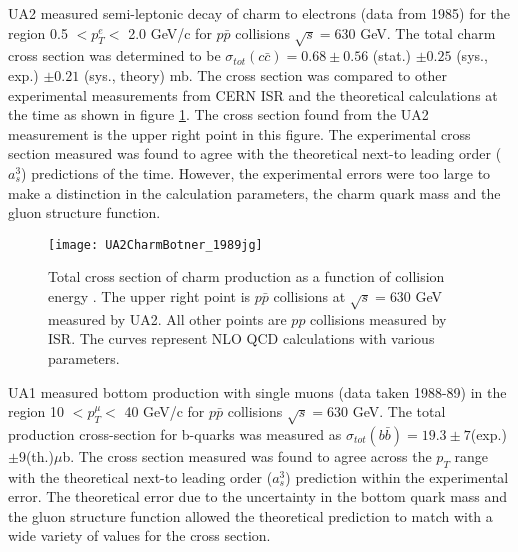UA2 measured semi-leptonic decay of charm to electrons \cite{Botner:1989jg} (data from 1985) for the region 0.5 $< p_{T}^{e} <$ 2.0 GeV/c for $p \bar p$ collisions $\sqrt{s} = $630 GeV. The total charm cross section was determined to be $\sigma _{tot}(c \bar c) = 0.68 \pm 0.56$ (stat.) $ \pm 0.25$ (sys., exp.) $ \pm 0.21 $ (sys., theory) mb. The cross section was compared to other experimental measurements from CERN ISR and the theoretical calculations at the time as shown in figure \ref{fig:UA2CharmBotner_1989jg}. The cross section found from the UA2 measurement is the upper right point in this figure.  The experimental cross section measured was found to agree with the theoretical next-to leading order ($a_{s}^{3}$) predictions of the time. However, the experimental errors were too large to make a distinction in the calculation parameters, the charm quark mass and the gluon structure function.

\begin{figure}[h]
  \centering
  \texttt{[image: UA2CharmBotner\_1989jg]}\\
  \caption{Total cross section of charm production as a function of collision energy \cite{Botner:1989jg}. The upper right point is $p \bar p$ collisions at $\sqrt{s} = $630 GeV measured by UA2. All other points are $pp$ collisions measured by ISR. The curves represent NLO QCD calculations with various parameters.} \label{fig:UA2CharmBotner_1989jg}
\end{figure}



UA1 measured bottom production with single muons \cite{Albajar:1990zu} (data taken 1988-89) in the region 10 $< p_{T}^{\mu} <$ 40 GeV/c for $p \bar p$ collisions $\sqrt{s} = $630 GeV. The total production cross-section for b-quarks was measured as $\sigma _{tot}(b \bar b) = 19.3 \pm 7 $(exp.)$ \pm 9 $(th.)$ \mu $b. The cross section measured was found to agree across the $p_{T}$ range with the theoretical next-to leading order ($a_{s}^{3}$) prediction within the experimental error. The theoretical error due to the uncertainty in the bottom quark mass and the gluon structure function allowed the theoretical prediction to match with a wide variety of values for the cross section.


